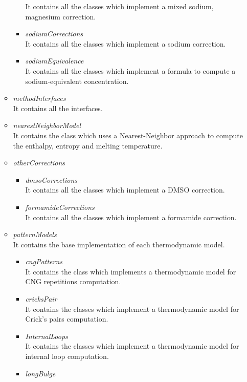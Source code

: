 \documentclass{article}
\begin{document}
\begin{itemize}
\begin{itemize}
\begin{itemize}
      It contains all the classes which implement a mixed sodium, magnesium correction.
      \item \textit{sodiumCorrections} \\
      It contains all the classes which implement a sodium correction.
      \item \textit{sodiumEquivalence} \\
      It contains all the classes which implement a formula to compute a sodium-equivalent concentration.
      \end{itemize}
    \item \textit{methodInterfaces} \\
    It contains all the interfaces.
    \item \textit{nearestNeighborModel} \\
    It contains the class which uses a Nearest-Neighbor approach to compute the enthalpy, entropy and
    melting temperature. 
    \item \textit{otherCorrections} \\
      \begin{itemize}
      \item \textit{dmsoCorrections} \\
      It contains all the classes which implement a DMSO correction.
      \item \textit{formamideCorrections} \\
      It contains all the classes which implement a formamide correction.
      \end{itemize}
    \item \textit{patternModels} \\
    It contains the base implementation of each thermodynamic model. 
      \begin{itemize}
      \item \textit{cngPatterns} \\
      It contains the class which implements a thermodynamic model for CNG repetitions computation.
      \item \textit{cricksPair} \\
      It contains the classes which implement a thermodynamic model for Crick's pairs computation.
      \item \textit{InternalLoops} \\
      It contains the classes which implement a thermodynamic model for internal loop computation.
      \item \textit{longBulge} \\

\end{itemize}
\end{itemize}
\end{itemize}
\end{document}
